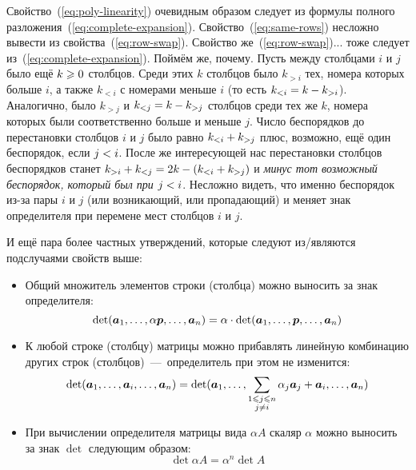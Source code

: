\documentclass[a4paper,12pt]{article}
\theoremstyle{remark}
\begin{document}
  Свойство~(\ref{eq:poly-linearity}) очевидным образом следует из формулы полного разложения~(\ref{eq:complete-expansion}).
  Свойство~(\ref{eq:same-rows}) несложно вывести из свойства~(\ref{eq:row-swap}).
  Свойство же~(\ref{eq:row-swap})... тоже следует из~(\ref{eq:complete-expansion}).
  Поймём же, почему.
  Пусть между столбцами $i$ и $j$ было ещё $k \hm\geq 0$ столбцов.
  Среди этих $k$ столбцов было $k_{>i}$ тех, номера которых больше $i$, а также $k_{<i}$ с номерами меньше $i$ (то есть $k_{<i} \hm= k \hm- k_{>i}$).
  Аналогично, было $k_{>j}$ и $k_{<j} \hm= k - k_{>j}$ столбцов среди тех же $k$, номера которых были соответственно больше и меньше $j$.
  Число беспорядков до перестановки столбцов $i$ и $j$ было равно $k_{<i} \hm+ k_{>j}$ плюс, возможно, ещё один беспорядок, если $j \hm< i$.
  После же интересующей нас перестановки столбцов беспорядков станет $k_{>i} \hm+ k_{<j} \hm= 2k \hm- (k_{<i} \hm+ k_{>j})$ и \emph{минус тот возможный беспорядок, который был при $j \hm< i$}.
  Несложно видеть, что именно беспорядок из-за пары $i$ и $j$ (или возникающий, или пропадающий) и меняет знак определителя при перемене мест столбцов $i$ и $j$.
  
  И ещё пара более частных утверждений, которые следуют из/являются подслучаями свойств выше:
  \begin{itemize}
    \item Общий множитель элементов строки (столбца) можно выносить за знак определителя:
      \begin{equation}\label{eq:common-multiplier-out-of-det}
        \det (\boldsymbol a_1, \ldots, \alpha \boldsymbol p, \ldots, \boldsymbol a_n)
          = \alpha \cdot \det (\boldsymbol a_1, \ldots, \boldsymbol p, \ldots, \boldsymbol a_n)
      \end{equation}
    \item К любой строке (столбцу) матрицы можно прибавлять линейную комбинацию других строк (столбцов)~---~определитель при этом не изменится:
      \begin{equation}\label{eq:add-rows-to-row-det-unchanged}
        \det (\boldsymbol a_1, \ldots, \boldsymbol a_i, \ldots, \boldsymbol a_n)
          = \det (\boldsymbol a_1, \ldots, \sum_{\substack{1 \leqslant j \leqslant n\\j \not= i}} \alpha_j \boldsymbol a_j + \boldsymbol a_i, \ldots, \boldsymbol a_n)
      \end{equation}
    \item При вычислении определителя матрицы вида $\alpha A$ скаляр $\alpha$ можно выносить за знак $\det$ следующим образом:
      \begin{equation}
        \det \alpha A = \alpha^n \det A
      \end{equation}
  \end{itemize}
  
\end{document}
